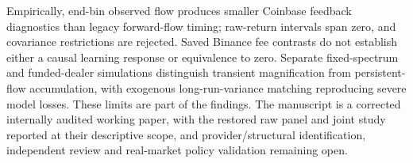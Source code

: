 \documentclass[12pt]{article}
\theoremstyle{definition}
\theoremstyle{remark}
\begin{document}
Empirically, end-bin observed flow produces smaller Coinbase feedback diagnostics than legacy forward-flow timing; raw-return intervals span zero, and covariance restrictions are rejected. Saved Binance fee contrasts do not establish either a causal learning response or equivalence to zero. Separate fixed-spectrum and funded-dealer simulations distinguish transient magnification from persistent-flow accumulation, with exogenous long-run-variance matching reproducing severe model losses. These limits are part of the findings. The manuscript is a corrected internally audited working paper, with the restored raw panel and joint study reported at their descriptive scope, and provider/structural identification, independent review and real-market policy validation remaining open.

\newpage
\end{document}
